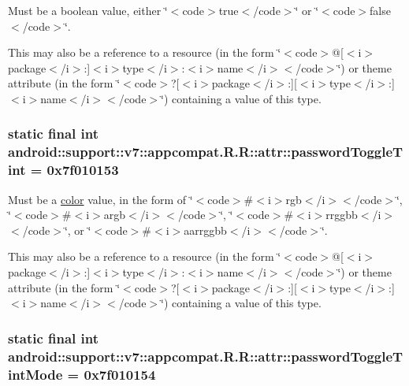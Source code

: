 Must be a boolean value, either \char`\"{}$<$code$>$true$<$/code$>$\char`\"{} or \char`\"{}$<$code$>$false$<$/code$>$\char`\"{}. 

This may also be a reference to a resource (in the form \char`\"{}$<$code$>$@\mbox{[}$<$i$>$package$<$/i$>$:\mbox{]}$<$i$>$type$<$/i$>$:$<$i$>$name$<$/i$>$$<$/code$>$\char`\"{}) or theme attribute (in the form \char`\"{}$<$code$>$?\mbox{[}$<$i$>$package$<$/i$>$:\mbox{]}\mbox{[}$<$i$>$type$<$/i$>$:\mbox{]}$<$i$>$name$<$/i$>$$<$/code$>$\char`\"{}) containing a value of this type. \hypertarget{classandroid_1_1support_1_1v7_1_1appcompat_1_1_r_1_1attr_f24ed10ab8ace48ca640b9b98aafc650}{
\subsubsection[{passwordToggleTint}]{\setlength{\rightskip}{0pt plus 5cm}static final int android::support::v7::appcompat.R.R::attr::passwordToggleTint = 0x7f010153}}
\label{classandroid_1_1support_1_1v7_1_1appcompat_1_1_r_1_1attr_f24ed10ab8ace48ca640b9b98aafc650}


Must be a \hyperlink{classandroid_1_1support_1_1v7_1_1appcompat_1_1_r_1_1color}{color} value, in the form of \char`\"{}$<$code$>$\#$<$i$>$rgb$<$/i$>$$<$/code$>$\char`\"{}, \char`\"{}$<$code$>$\#$<$i$>$argb$<$/i$>$$<$/code$>$\char`\"{}, \char`\"{}$<$code$>$\#$<$i$>$rrggbb$<$/i$>$$<$/code$>$\char`\"{}, or \char`\"{}$<$code$>$\#$<$i$>$aarrggbb$<$/i$>$$<$/code$>$\char`\"{}. 

This may also be a reference to a resource (in the form \char`\"{}$<$code$>$@\mbox{[}$<$i$>$package$<$/i$>$:\mbox{]}$<$i$>$type$<$/i$>$:$<$i$>$name$<$/i$>$$<$/code$>$\char`\"{}) or theme attribute (in the form \char`\"{}$<$code$>$?\mbox{[}$<$i$>$package$<$/i$>$:\mbox{]}\mbox{[}$<$i$>$type$<$/i$>$:\mbox{]}$<$i$>$name$<$/i$>$$<$/code$>$\char`\"{}) containing a value of this type. \hypertarget{classandroid_1_1support_1_1v7_1_1appcompat_1_1_r_1_1attr_3c4ba396f3341f74b8e62379642db9ce}{
\subsubsection[{passwordToggleTintMode}]{\setlength{\rightskip}{0pt plus 5cm}static final int android::support::v7::appcompat.R.R::attr::passwordToggleTintMode = 0x7f010154}}
\label{classandroid_1_1support_1_1v7_1_1appcompat_1_1_r_1_1attr_3c4ba396f3341f74b8e62379642db9ce}


